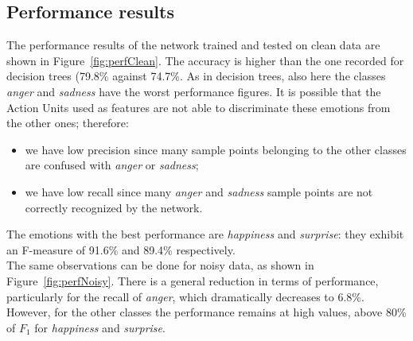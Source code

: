 \documentclass{article}
\begin{document}
\subsection{Performance results}
The performance results of the network trained and tested on clean data are shown in Figure~\ref{fig:perfClean}. The accuracy is higher than the one recorded for decision trees (79.8\% against 74.7\%. As in decision trees, also here the classes \emph{anger} and \emph{sadness} have the worst performance figures. It is possible that the Action Units used as features are not able to discriminate these emotions from the other ones; therefore:
\begin{itemize}
	\item we have low precision since many sample points belonging to the other classes are confused with \emph{anger} or \emph{sadness};
	\item we have low recall since many \emph{anger} and \emph{sadness} sample points are not correctly recognized by the network.
\end{itemize}
The emotions with the best performance are \emph{happiness} and \emph{surprise}: they exhibit an F-measure of 91.6\% and 89.4\% respectively.\\
The same observations can be done for noisy data, as shown in Figure~\ref{fig:perfNoisy}. There is a general reduction in terms of performance, particularly for the recall of \emph{anger}, which dramatically decreases to 6.8\%. However, for the other classes the performance remains at high values, above 80\% of $F_1$ for \emph{happiness} and \emph{surprise}.
\end{document}
